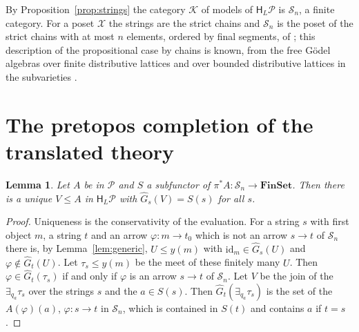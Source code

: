 \documentclass[11pt]{amsart}
\newtheorem{lem}[thm]{Lemma}
\theoremstyle{definition}
\newcommand{\Fin}{\mathbf{FinSet}}
\newcommand{\HH}{\mathsf H}
\newcommand{\cX}{\mathcal X}
\newcommand{\cP}{\mathcal P}
\newcommand{\cS}{\mathcal S}
\newcommand{\cK}{\mathcal K}
\newcommand{\id}{\mathrm{id}}
\begin{document}
By Proposition~\ref{prop:strings} the category $\cK$ of models of
$\HH_L\cP$ is $\cS_n$, a finite category. For a poset $\cX$ the strings
are the strict chains and $\cS_n$ is the poset of the strict chains
with at most $n$ elements, ordered by final segments, of
\cite[\S6]{Interm}; this description of the propositional case by
chains is known, from the free G\"odel algebras over finite
distributive lattices \cite{AGM08} and over bounded distributive
lattices in the subvarieties \cite{Carai}.

\section{The pretopos completion of the translated theory}

\begin{lem}\label{lem:definable}
Let $A$ be in $\cP$ and $S$ a subfunctor of $\pi^*A\colon\cS_n\to\Fin$.
Then there is a unique $V\le A$ in $\HH_L\cP$ with $\hat G_s(V)=S(s)$
for all $s$.
\end{lem}
\begin{proof}
Uniqueness is the conservativity of the evaluation. For a string $s$
with first object $m$, a string $t$ and an arrow $\varphi\colon m\to
t_0$ which is not an arrow $s\to t$ of $\cS_n$ there is, by
Lemma~\ref{lem:generic}, $U\le y(m)$ with $\id_m\in\hat G_s(U)$ and
$\varphi\notin\hat G_t(U)$. Let $\tau_s\le y(m)$ be the meet of these
finitely many $U$. Then $\varphi\in\hat G_t(\tau_s)$ if and only if
$\varphi$ is an arrow $s\to t$ of $\cS_n$. Let $V$ be the join of the
$\exists_{q_a}\tau_s$ over the strings $s$ and the $a\in S(s)$. Then
$\hat G_t(\exists_{q_a}\tau_s)$ is the set of the $A(\varphi)(a)$,
$\varphi\colon s\to t$ in $\cS_n$, which is contained in $S(t)$ and
contains $a$ if $t=s$.
\end{proof}
\end{document}
